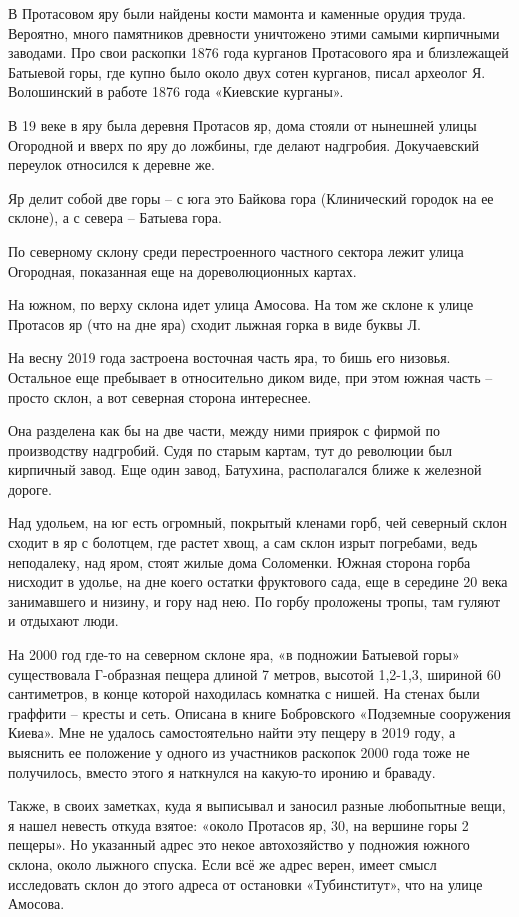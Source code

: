 В Протасовом яру были найдены кости мамонта и каменные орудия труда. Вероятно, много памятников древности уничтожено этими самыми кирпичными заводами. Про свои раскопки 1876 года курганов Протасового яра и близлежащей Батыевой горы, где купно было около двух сотен курганов, писал археолог Я. Волошинский в работе 1876 года «Киевские курганы».

В 19 веке в яру была деревня Протасов яр, дома стояли от нынешней улицы Огородной и вверх по яру до ложбины, где делают надгробия. Докучаевский переулок относился к деревне же.

Яр делит собой две горы – с юга это Байкова гора (Клинический городок на ее склоне), а с севера – Батыева гора. 

По северному склону среди перестроенного частного сектора лежит улица Огородная, показанная еще на дореволюционных картах.

На южном, по верху склона идет улица Амосова. На том же склоне к улице Протасов яр (что на дне яра) сходит лыжная горка в виде буквы Л.

На весну 2019 года застроена восточная часть яра, то бишь его низовья. Остальное еще пребывает в относительно диком виде, при этом южная часть – просто склон, а вот северная сторона интереснее.

Она разделена как бы на две части, между ними приярок с фирмой по производству надгробий. Судя по старым картам, тут до революции был кирпичный завод. Еще один завод, Батухина, располагался ближе к железной дороге.

Над удольем, на юг есть огромный, покрытый кленами горб, чей северный склон сходит в яр с болотцем, где растет хвощ, а сам склон изрыт погребами, ведь неподалеку, над яром, стоят жилые дома Соломенки. Южная сторона горба нисходит в удолье, на дне коего остатки фруктового сада, еще в середине 20 века занимавшего и низину, и гору над нею. По горбу проложены тропы, там гуляют и отдыхают люди.

На 2000 год где-то на северном склоне яра, «в подножии Батыевой горы» существовала Г-образная пещера длиной 7 метров, высотой 1,2-1,3, шириной 60 сантиметров, в конце которой находилась комнатка с нишей. На стенах были граффити – кресты и сеть. Описана в книге Бобровского «Подземные сооружения Киева». Мне не удалось самостоятельно найти эту пещеру в 2019 году, а выяснить ее положение у одного из участников раскопок 2000 года тоже не получилось, вместо этого я наткнулся на какую-то иронию и браваду.

Также, в своих заметках, куда я выписывал и заносил разные любопытные вещи, я нашел невесть откуда взятое: «около Протасов яр, 30, на вершине горы 2 пещеры». Но указанный адрес это некое автохозяйство у подножия южного склона, около лыжного спуска. Если всё же адрес верен, имеет смысл исследовать склон до этого адреса от остановки «Тубинститут», что на улице Амосова.

